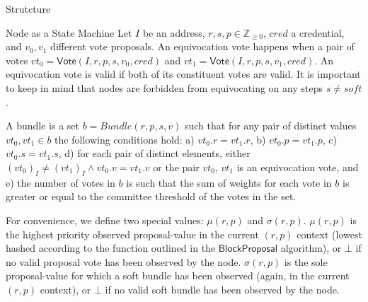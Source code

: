 \documentclass[10pt,a4paper]{article}
\begin{document}
\begin{section}{Strutcture}
\begin{subsection}{Node as a State Machine}
Let $I$ be an address, $r, s, p\in\mathbb{Z}_{\ge 0}$, $cred$ a credential, and $v_0,v_1$ different
vote proposals.
An {\sf equivocation vote} happens when a pair of votes
$vt_0 = \mathsf{Vote}(I, r, p, s, v_0, cred)$ and $vt_1 = \mathsf{Vote}(I, r, p, s, v_1, cred)$.
An equivocation vote is valid if both of its constituent votes are valid.
It is important to keep in mind that nodes are forbidden from equivocating 
on any steps $s \neq soft$.

A {\sf bundle} is a set $b = Bundle(r,p,s,v)$ such that for any pair of distinct values 
$vt_0, vt_1 \in b$ the following conditions hold: 
a) $vt_0.r = vt_1.r $, 
b) $vt_0.p = vt_1.p$,
c) $vt_0.s = vt_1.s$,
d) for each pair of distinct elements, either $(vt_0)_I \neq (vt_1)_I \land vt_0.v = vt_1.v$ or the pair $vt_0$, $vt_1$ 
is an equivocation vote, and
e) the number of votes in $b$ is such that the sum of weights for each vote in $b$ is greater or equal to the
committee threshold of the votes in the set.

For convenience, we define two special values: $\mu(r,p)$ and $\sigma(r,p)$.
$\mu(r,p)$ is the highest priority observed proposal-value in the current $(r,p)$ context 
(lowest hashed according to the function outlined in the $\mathsf{BlockProposal}$ algorithm), 
or $\bot$ if no valid proposal vote has been observed by the node.
$\sigma(r,p)$ is the sole proposal-value for which a soft bundle has been observed (again, 
in the current $(r,p)$ context), or $\bot$ if no valid soft bundle has been observed by the 
node.
\end{subsection}

\end{section}
\end{document}
